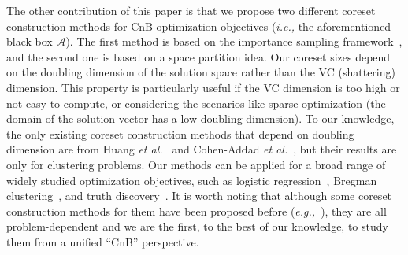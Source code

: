 \documentclass{article}
\begin{document}
The other contribution of this paper is that we propose two different coreset construction methods for CnB optimization objectives ({\em i.e.,} the aforementioned black box $\mathcal{A}$). 
The first method is based on the importance sampling framework~\cite{FeldmanL11}, and the second one is based on a space partition idea. Our coreset sizes depend on the doubling dimension of the solution space rather than the VC (shattering) dimension. This property is particularly useful if the VC dimension is too high or not easy to compute, or considering the scenarios like sparse optimization (the domain of the solution vector has a low doubling dimension). To our knowledge, the only existing coreset construction methods that depend on doubling dimension are from Huang {\em et al.}~\cite{HuangJLW18} and Cohen-Addad {\em et al.}~\cite{DBLP:conf/stoc/Cohen-AddadSS21}, but their results are only for clustering problems. Our methods can be applied for a broad range of widely studied optimization objectives, such as  
logistic regression~\cite{MunteanuSSW18}, Bregman clustering~\cite{BanerjeeMDG05}, and truth discovery~\cite{DBLP:journals/sigkdd/LiGMLSZFH15}. It is worth noting that although some coreset construction methods for them have been proposed before ({\em e.g.,}~\cite{DBLP:conf/aistats/LucicBK16,MunteanuSSW18,tolochinsky2018generic,DBLP:conf/icml/DingW20,DBLP:conf/icml/HuangHLFD21}), they are all problem-dependent and we are the first, to the best of our knowledge, to study them from a unified ``CnB'' perspective. 


\end{document}
